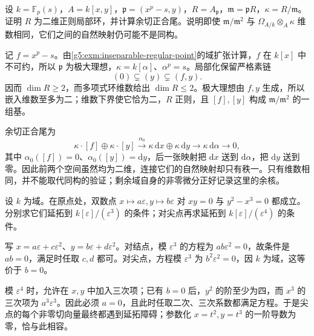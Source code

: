 \begin{exercise}\label{g5:ex:inseparable-plane-cotangent}
	设 \(k=\mathbb F_p(s)\)，\(A=k[x,y]\)，\(\mathfrak p=(x^p-s,y)\)，\(R=A_{\mathfrak p}\)，\(\mathfrak m=\mathfrak pR\)，\(\kappa=R/\mathfrak m\)。证明 \(R\) 为二维正则局部环，并计算余切正合尾。说明即使 \(\mathfrak m/\mathfrak m^2\) 与 \(\Omega_{A/k}\otimes_A\kappa\) 维数相同，它们之间的自然映射仍可能不是同构。
\end{exercise}
\begin{solution}
	记 \(f=x^p-s\)。由\cref{g5:exm:inseparable-regular-point}的域扩张计算，\(f\) 在 \(k[x]\) 中不可约，所以 \(\mathfrak p\) 为极大理想，\(\kappa=k[\alpha]\)、\(\alpha^p=s\)。局部化保留严格素链
	\[
		(0)\subsetneq(y)\subsetneq(f,y).
	\]
	因而 \(\dim R\geq2\)，而多项式环维数给出 \(\dim R\leq2\)。极大理想由 \(f,y\) 生成，所以嵌入维数至多为二；维数下界使它恰为二，\(R\) 正则，且 \([f],[y]\) 构成 \(\mathfrak m/\mathfrak m^2\) 的一组基。

	余切正合尾为
	\[
		\kappa\cdot[f]\oplus\kappa\cdot[y]
		\xrightarrow{\alpha_0}
		\kappa\,\mathrm{d}x\oplus\kappa\,\mathrm{d}y
		\longrightarrow\kappa\,\mathrm{d}\alpha\longrightarrow0,
	\]
	其中 \(\alpha_0([f])=0\)、\(\alpha_0([y])=\mathrm{d}y\)，后一张映射把 \(\mathrm{d}x\) 送到 \(\mathrm{d}\alpha\)，把 \(\mathrm{d}y\) 送到零。因此前两个空间虽然均为二维，连接它们的自然映射却只有秩一。只有维数相同，并不能取代同构的验证；剩余域自身的非零微分正好记录这里的余核。
\end{solution}

\begin{exercise}\label{g5:ex:tangent-vector-higher-lift}
	设 \(k\) 为域。在原点处，双数点 \(x\mapsto a\varepsilon,y\mapsto b\varepsilon\) 对 \(xy=0\) 与 \(y^2-x^3=0\) 都成立。分别求它们延拓到 \(k[\varepsilon]/(\varepsilon^3)\) 的条件；对尖点再求延拓到 \(k[\varepsilon]/(\varepsilon^4)\) 的条件。
\end{exercise}
\begin{solution}
	写 \(x=a\varepsilon+c\varepsilon^2\)、\(y=b\varepsilon+d\varepsilon^2\)。对结点，模 \(\varepsilon^3\) 的方程为 \(ab\varepsilon^2=0\)，故条件是 \(ab=0\)，满足时任取 \(c,d\) 都可。对尖点，方程模 \(\varepsilon^3\) 为 \(b^2\varepsilon^2=0\)，因 \(k\) 为域，这等价于 \(b=0\)。

	模 \(\varepsilon^4\) 时，允许在 \(x,y\) 中加入三次项；已有 \(b=0\) 后，\(y^2\) 的阶至少为四，而 \(x^3\) 的三次项为 \(a^3\varepsilon^3\)。因此必须 \(a=0\)，且此时任取二次、三次系数都满足方程。于是尖点的每个非零切向量最终都遇到延拓障碍；参数化 \(x=t^2,y=t^3\) 的一阶导数为零，恰与此相容。
\end{solution}


